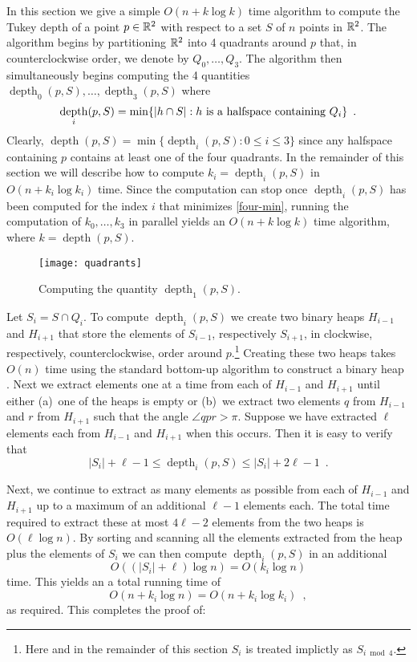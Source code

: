 \documentclass[charterfonts,lotsofwhite]{patmorin}
\DeclareMathOperator{\td}{depth}
\begin{document}
In this section we give a simple $O(n + k\log k)$ time algorithm to
compute the Tukey depth of a point $p\in\mathbb{R}^2$ with respect to
a set $S$ of $n$ points in $\mathbb{R}^2$.  The algorithm begins by
partitioning $\mathbb{R}^2$ into 4 quadrants around $p$ that, in
counterclockwise order, we denote by $Q_0,\ldots,Q_3$.
The algorithm then simultaneously begins computing the 4 quantities
$\td_0(p,S),\ldots,\td_3(p,S)$ where 
\begin{equation}
     \td_i(p,S) = \min\{|h\cap S| : \mbox{$h$ is a halfspace containing $Q_i$} \} \enspace . \eqlabel{four-min}
\end{equation}
Clearly, $\td(p,S) = \min\{\td_i(p,S): 0\le i \le 3 \}$ since any
halfspace containing $p$ contains at least one of the four quadrants.
In the remainder of this section we will describe how to compute
$k_i=\td_i(p,S)$ in $O(n + k_i\log k_i)$ time.  Since the
computation can stop once $\td_i(p,S)$ has been computed for
the index $i$ that minimizes \eqref{four-min}, running the computation
of $k_0,\ldots,k_3$ in parallel yields an $O(n +
k\log k)$ time algorithm, where $k=\td(p,S)$.

\begin{figure}
\begin{center} \texttt{[image: quadrants]} \end{center}
\caption{Computing the quantity $\td_1(p,S)$.}
\end{figure}


Let $S_i=S\cap Q_i$. To compute $\td_i(p,S)$ we create two binary
heaps $H_{i-1}$ and $H_{i+1}$ that store the elements of $S_{i-1}$,
respectively $S_{i+1}$, in clockwise, respectively, counterclockwise,
order around $p$.\footnote{Here and in the remainder of this section
$S_i$ is treated implictly as $S_{i\bmod 4}$.} 
Creating these two heaps takes $O(n)$ time using the
standard bottom-up algorithm to construct a binary heap
\cite[Chapter~6]{clrs01}.
Next we extract elements one at a time from each of $H_{i-1}$ and
$H_{i+1}$ until either (a)~one of the heaps is empty or (b)~we extract
two elements $q$ from $H_{i-1}$ and $r$ from $H_{i+1}$ such that the
angle $\angle qpr > \pi$.  Suppose we have extracted $\ell$ elements
each from $H_{i-1}$ and $H_{i+1}$ when this occurs.  Then it is easy
to verify that 
\[  
  |S_i| + \ell - 1 \le \td_i(p,S) \le |S_i| + 2\ell-1 \enspace .
\]

Next, we continue to extract as many elements as possible from each of
$H_{i-1}$ and $H_{i+1}$ up to a maximum of an additional $\ell-1$
elements each. The total time required to extract these at most
$4\ell-2$ elements from the two heaps is $O(\ell\log n)$.  By sorting and
scanning all the elements extracted from the heap plus the elements of
$S_i$ we can then compute $\td_i(p,S)$ in an additional
\[
     O((|S_i|+\ell)\log n) = O(k_i\log n)
\] 
time.  This yields an a total running time of 
\[  
   O(n + k_i\log n) = O(n + k_i\log k_i) \enspace ,
\]
as required.  This completes the proof of:
\end{document}
